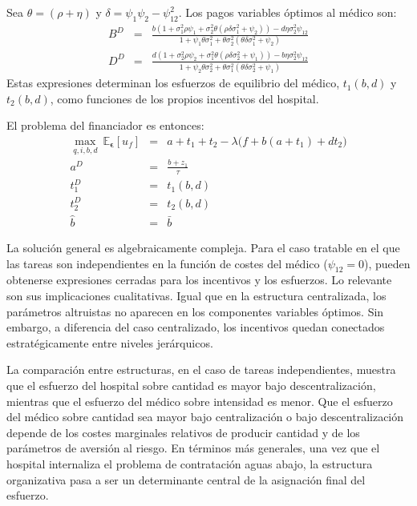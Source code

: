 ﻿\documentclass[12pt,letterpaper]{article}
\begin{document}
Sea $\theta=(\rho+\eta)$ y $\delta=\psi_1\psi_2-\psi_{12}^2$. Los pagos variables \'optimos al m\'edico son:
\begin{eqnarray*}
B^D&=&\frac{b(1+\sigma_1^2\rho\psi_1+\sigma_2^2\theta(\rho\delta\sigma_1^2+\psi_2))-d\eta\sigma_2^2\psi_{12}}{1+\psi_1\theta\sigma_1^2+\theta\sigma_2^2(\theta\delta\sigma_1^2+\psi_2)}\\
D^D&=&\frac{d(1+\sigma_2^2\rho\psi_2+\sigma_1^2\theta(\rho\delta\sigma_2^2+\psi_1))-b\eta\sigma_2^2\psi_{12}}{1+\psi_2\theta\sigma_2^2+\theta\sigma_1^2(\theta\delta\sigma_2^2+\psi_1)}
\end{eqnarray*}
Estas expresiones determinan los esfuerzos de equilibrio del m\'edico, $t_1(b,d)$ y $t_2(b,d)$, como funciones de los propios incentivos del hospital.

El problema del financiador es entonces:
\begin{eqnarray*}
\max\limits_{q,i,b,d}\ \mathbb{E}_{\bm{\epsilon}}[u_f]
&=&
a+t_1+t_2-\lambda\big(f+b(a+t_1)+dt_2\big)\\
a^D&=&\frac{b+z_1}{\tau}\\
t_1^D&=&t_1(b,d)\\
t_2^D&=&t_2(b,d)\\
\hat{b}&=&\bar{b}
\end{eqnarray*}

La soluci\'on general es algebraicamente compleja. Para el caso tratable en el que las tareas son independientes en la funci\'on de costes del m\'edico ($\psi_{12}=0$), pueden obtenerse expresiones cerradas para los incentivos y los esfuerzos. Lo relevante son sus implicaciones cualitativas. Igual que en la estructura centralizada, los par\'ametros altruistas no aparecen en los componentes variables \'optimos. Sin embargo, a diferencia del caso centralizado, los incentivos quedan conectados estrat\'egicamente entre niveles jer\'arquicos.

La comparaci\'on entre estructuras, en el caso de tareas independientes, muestra que el esfuerzo del hospital sobre cantidad es mayor bajo descentralizaci\'on, mientras que el esfuerzo del m\'edico sobre intensidad es menor. Que el esfuerzo del m\'edico sobre cantidad sea mayor bajo centralizaci\'on o bajo descentralizaci\'on depende de los costes marginales relativos de producir cantidad y de los par\'ametros de aversi\'on al riesgo. En t\'erminos m\'as generales, una vez que el hospital internaliza el problema de contrataci\'on aguas abajo, la estructura organizativa pasa a ser un determinante central de la asignaci\'on final del esfuerzo.
\end{document}
